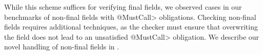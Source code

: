   While this scheme suffices for verifying final fields, we observed cases
  in our benchmarks of non-final fields with \<@MustCall> obligations.  Checking
  non-final fields requires additional techniques, as the checker must ensure
  that overwriting the field does not lead to an unsatisfied \<@MustCall> obligation.  We
  describe our novel handling of non-final fields in .


